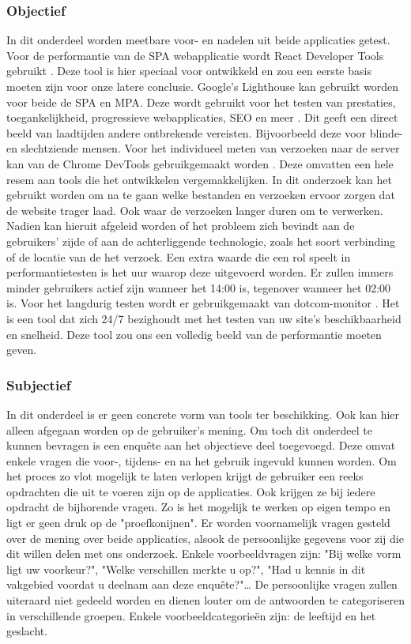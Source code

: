 \documentclass{hogent-article}
\begin{document}
\subsubsection{Objectief}
In dit onderdeel worden meetbare voor- en nadelen uit beide applicaties getest.
Voor de performantie van de SPA webapplicatie wordt React Developer Tools gebruikt \autocite{RDT2022}.
Deze tool is hier speciaal voor ontwikkeld en zou een eerste basis moeten zijn voor onze latere conclusie.
Google's Lighthouse kan gebruikt worden voor beide de SPA en MPA.
Deze wordt gebruikt voor het testen van prestaties, toegankelijkheid, progressieve webapplicaties, SEO en meer \autocite{GoogleLighthouse2022}.
Dit geeft een direct beeld van laadtijden andere ontbrekende vereisten.
Bijvoorbeeld deze voor blinde- en slechtziende mensen.
Voor het individueel meten van verzoeken naar de server kan van de Chrome DevTools gebruikgemaakt worden \autocite{GoogleDevTools2016}.
Deze omvatten een hele resem aan tools die het ontwikkelen vergemakkelijken.
In dit onderzoek kan het gebruikt worden om na te gaan welke bestanden en verzoeken ervoor zorgen dat de website trager laad.
Ook waar de verzoeken langer duren om te verwerken.
Nadien kan hieruit afgeleid worden of het probleem zich bevindt aan de gebruikers' zijde of aan de achterliggende technologie, zoals het soort verbinding of de locatie van de het verzoek.
Een extra waarde die een rol speelt in performantietesten is het uur waarop deze uitgevoerd worden.
Er zullen immers minder gebruikers actief zijn wanneer het 14:00 is, tegenover wanneer het 02:00 is.
Voor het langdurig testen wordt er gebruikgemaakt van dotcom-monitor \autocite{dotcom-monitor2022}.
Het is een tool dat zich 24/7 bezighoudt met het testen van uw site's beschikbaarheid en snelheid.
Deze tool zou ons een volledig beeld van de performantie moeten geven.

\subsubsection{Subjectief}
In dit onderdeel is er geen concrete vorm van tools ter beschikking.
Ook kan hier alleen afgegaan worden op de gebruiker's mening.
Om toch dit onderdeel te kunnen bevragen is een enquête aan het objectieve deel toegevoegd.
Deze omvat enkele vragen die voor-, tijdens- en na het gebruik ingevuld kunnen worden.
Om het proces zo vlot mogelijk te laten verlopen krijgt de gebruiker een reeks opdrachten die uit te voeren zijn op de applicaties.
Ook krijgen ze bij iedere opdracht de bijhorende vragen.
Zo is het mogelijk te werken op eigen tempo en ligt er geen druk op de "proefkonijnen".
Er worden voornamelijk vragen gesteld over de mening over beide applicaties, alsook de persoonlijke gegevens voor zij die dit willen delen met ons onderzoek.
Enkele voorbeeldvragen zijn:
"Bij welke vorm ligt uw voorkeur?",
"Welke verschillen merkte u op?",
"Had u kennis in dit vakgebied voordat u deelnam aan deze enquête?"\dots
De persoonlijke vragen zullen uiteraard niet gedeeld worden en dienen louter om de antwoorden te categoriseren in verschillende groepen.
Enkele voorbeeldcategorieën zijn: de leeftijd en het geslacht.
\end{document}
